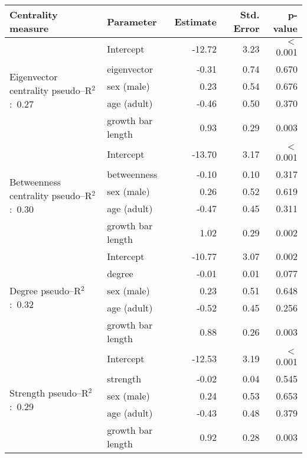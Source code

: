 \documentclass[10pt, twoside]{book} %
\begin{document}
\begin{table}[h!]
\begin{center}
\begin{footnotesize}
\begin{tabular}{p{2cm} l r r r }
				\toprule
				\textbf{Centrality measure} & \textbf{Parameter} & \textbf{Estimate} & \textbf{Std. Error} &\textbf{p-value}\\
				\hline
				\multirow{5}{2cm}{Eigenvector centrality \mbox{pseudo--R$^2$: 0.27}} & Intercept & -12.72 & 3.23 & $<$ 0.001\\
				& eigenvector & -0.31 & 0.74 & 0.670\\
				& sex (male) & 0.23 & 0.54 & 0.676\\
				& age (adult) & -0.46 & 0.50 & 0.370\\
				& growth bar length & 0.93 & 0.29 & 0.003\\
				\hline
				\multirow{5}{2cm}{Betweenness centrality \mbox{pseudo--R$^2$: 0.30}} & Intercept & -13.70 & 3.17 & $<$ 0.001\\
				& betweenness & -0.10 & 0.10 & 0.317\\
				& sex (male) & 0.26 & 0.52 & 0.619\\
				& age (adult) & -0.47 & 0.45 & 0.311\\
				& growth bar length & 1.02 & 0.29 & 0.002\\
				\hline
				\multirow{5}{2cm}{Degree \mbox{pseudo--R$^2$: 0.32}} & Intercept & -10.77 & 3.07 & 0.002\\
				& degree & -0.01 & 0.01 & 0.077\\
				& sex (male) & 0.23 & 0.51 & 0.648\\
				& age (adult) & -0.52 & 0.45 & 0.256\\
				& growth bar length & 0.88 & 0.26 & 0.003\\
				\hline
				\multirow{5}{2cm}{Strength \mbox{pseudo--R$^2$: 0.29}} & Intercept & -12.53 & 3.19 & $<$ 0.001\\
				& strength & -0.02 & 0.04 & 0.545\\
				& sex (male) & 0.24 & 0.53 & 0.653\\
				& age (adult) & -0.43 & 0.48 & 0.379\\
				& growth bar length & 0.92 & 0.28 & 0.003\\
				\bottomrule
			\end{tabular}\endgroup
		\end{footnotesize}
	\end{center}
\end{table}	
\end{document}
